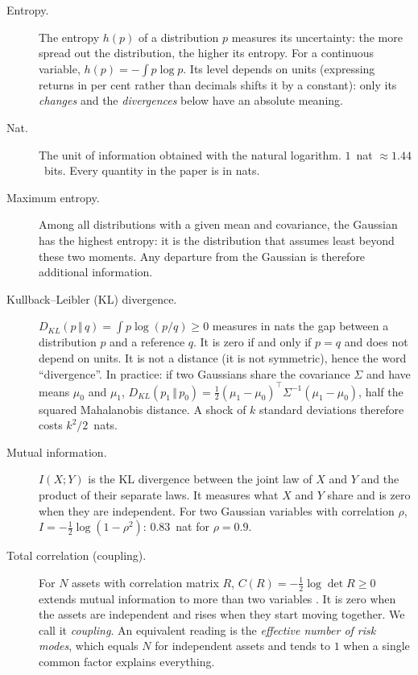 \documentclass[11pt]{article}
\theoremstyle{definition}
\newcommand{\KL}[2]{D_{KL}\!\left(#1\,\Vert\,#2\right)}
\begin{document}
\begin{description}
\item[Entropy.] The entropy $h(p)$ of a distribution $p$ measures its
uncertainty: the more spread out the distribution, the higher its entropy. For
a continuous variable, $h(p)=-\int p\log p$. Its level depends on units
(expressing returns in per cent rather than decimals shifts it by a constant):
only its \emph{changes} and the \emph{divergences} below have an absolute
meaning.

\item[Nat.] The unit of information obtained with the natural logarithm.
$1$~nat $\approx 1.44$~bits. Every quantity in the paper is in nats.

\item[Maximum entropy.] Among all distributions with a given mean and
covariance, the Gaussian has the highest entropy: it is the distribution that
assumes least beyond these two moments. Any departure from the Gaussian is
therefore additional information.

\item[Kullback--Leibler (KL) divergence.] $\KL{p}{q}=\int p\log(p/q)\ge0$
measures in nats the gap between a distribution $p$ and a reference $q$. It
is zero if and only if $p=q$ and does not depend on units. It is not a
distance (it is not symmetric), hence the word ``divergence''. In practice: if
two Gaussians share the covariance $\Sigma$ and have means $\mu_0$ and $\mu_1$,
$\KL{p_1}{p_0}=\tfrac12(\mu_1-\mu_0)^\top\Sigma^{-1}(\mu_1-\mu_0)$, half the
squared Mahalanobis distance. A shock of $k$ standard deviations therefore
costs $k^2/2$~nats.

\item[Mutual information.] $I(X;Y)$ is the KL divergence between the joint law
of $X$ and $Y$ and the product of their separate laws. It measures what $X$
and $Y$ share and is zero when they are independent. For two Gaussian
variables with correlation $\rho$, $I=-\tfrac12\log(1-\rho^2)$: $0.83$~nat for
$\rho=0.9$.

\item[Total correlation (coupling).] For $N$ assets with correlation matrix
$R$, $C(R)=-\tfrac12\log\det R\ge0$ extends mutual information to more than
two variables \citep{watanabe1960}. It is zero when the assets are independent
and rises when they start moving together. We call it \emph{coupling}. An
equivalent reading is the \emph{effective number of risk modes}, which equals
$N$ for independent assets and tends to $1$ when a single common factor
explains everything.


\end{description}
\end{document}
